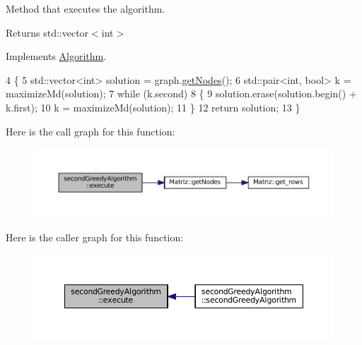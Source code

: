 Method that executes the algorithm. 

\begin{DoxyReturn}{Returns}
std\+::vector$<$int$>$ 
\end{DoxyReturn}


Implements \hyperlink{classAlgorithm_af6ea9eb9a6dbd41896e3fd7dabac096b}{Algorithm}.


\begin{DoxyCode}
4 \{
5   std::vector<int> solution = graph.\hyperlink{classMatriz_a394b84a5ec13fd2f4d202ab218680afe}{getNodes}();
6   std::pair<int, bool> k = maximizeMd(solution);
7   \textcolor{keywordflow}{while} (k.second)
8   \{
9     solution.erase(solution.begin() + k.first);
10     k = maximizeMd(solution);
11   \}
12   \textcolor{keywordflow}{return} solution;
13 \}
\end{DoxyCode}
Here is the call graph for this function\+:
\nopagebreak
\begin{figure}[H]
\begin{center}
\leavevmode
\includegraphics[width=350pt]{classsecondGreedyAlgorithm_a119a730116003d00438179ccf4e2cafd_cgraph}
\end{center}
\end{figure}
Here is the caller graph for this function\+:
\nopagebreak
\begin{figure}[H]
\begin{center}
\leavevmode
\includegraphics[width=350pt]{classsecondGreedyAlgorithm_a119a730116003d00438179ccf4e2cafd_icgraph}
\end{center}
\end{figure}
\mbox{\label{classsecondGreedyAlgorithm_a714fa858b1666fc77153890ac16f1b3f}} 
